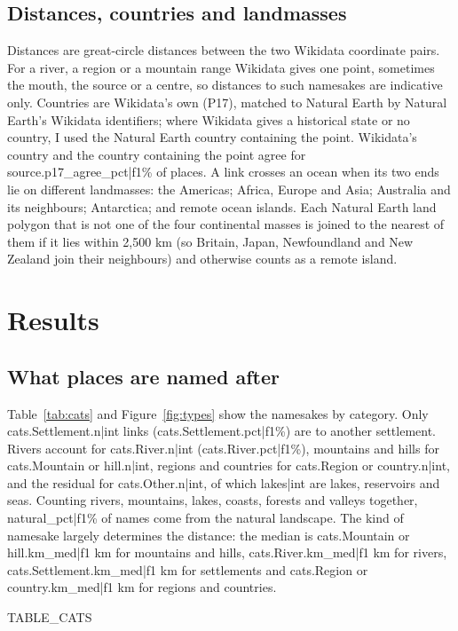 \documentclass[11pt,a4paper]{article}
\begin{document}
\subsection{Distances, countries and landmasses}
Distances are great-circle distances between the two Wikidata coordinate pairs. For a river, a region or a mountain range Wikidata gives one point, sometimes the mouth, the source or a centre, so distances to such namesakes are indicative only. Countries are Wikidata's own (P17), matched to Natural Earth \citep{naturalearth} by Natural Earth's Wikidata identifiers; where Wikidata gives a historical state or no country, I used the Natural Earth country containing the point. Wikidata's country and the country containing the point agree for {{source.p17_agree_pct|f1}}\% of places. A link crosses an ocean when its two ends lie on different landmasses: the Americas; Africa, Europe and Asia; Australia and its neighbours; Antarctica; and remote ocean islands. Each Natural Earth land polygon that is not one of the four continental masses is joined to the nearest of them if it lies within 2,500 km (so Britain, Japan, Newfoundland and New Zealand join their neighbours) and otherwise counts as a remote island.

\section{Results}
\subsection{What places are named after}
Table~\ref{tab:cats} and Figure~\ref{fig:types} show the namesakes by category. Only {{cats.Settlement.n|int}} links ({{cats.Settlement.pct|f1}}\%) are to another settlement. Rivers account for {{cats.River.n|int}} ({{cats.River.pct|f1}}\%), mountains and hills for {{cats.Mountain or hill.n|int}}, regions and countries for {{cats.Region or country.n|int}}, and the residual for {{cats.Other.n|int}}, of which {{lakes|int}} are lakes, reservoirs and seas. Counting rivers, mountains, lakes, coasts, forests and valleys together, {{natural_pct|f1}}\% of names come from the natural landscape. The kind of namesake largely determines the distance: the median is {{cats.Mountain or hill.km_med|f1}} km for mountains and hills, {{cats.River.km_med|f1}} km for rivers, {{cats.Settlement.km_med|f1}} km for settlements and {{cats.Region or country.km_med|f1}} km for regions and countries.

{{TABLE_CATS}}
\end{document}
